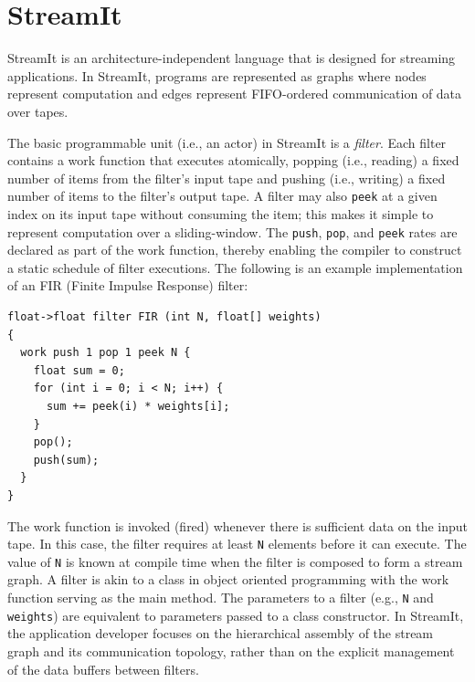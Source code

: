\section{StreamIt}
\label{sec:streamit}

StreamIt  is   an  architecture-independent  language that is
designed for  streaming applications. In StreamIt, programs are
represented as graphs where  nodes represent  computation and edges
represent FIFO-ordered communication of data over tapes.

The  basic programmable  unit (i.e., an actor) in  StreamIt is a {\it
filter}.   Each filter contains  a work  function that executes
atomically,  popping (i.e., reading)  a fixed number  of items  from
the  filter's input  tape and pushing (i.e., writing) a fixed number
of items to the filter's output tape.  A filter  may also {\tt peek} at
a given index  on its input tape without  consuming  the  item;  this
makes  it  simple  to  represent computation over a
sliding-window.   The {\tt push}, {\tt pop}, and {\tt peek} rates are
declared as part  of  the work  function,  thereby enabling  the
compiler    to construct a static schedule of filter executions. The
following is an example implementation of an FIR   (Finite Impulse
Response)  filter: 
{\small
\begin{verbatim}
float->float filter FIR (int N, float[] weights) 
{
  work push 1 pop 1 peek N {
    float sum = 0;
    for (int i = 0; i < N; i++) {
      sum += peek(i) * weights[i];
    }
    pop();
    push(sum);
  }
}
\end{verbatim}}

The work function is invoked (fired) whenever there is sufficient data
on the input tape. In this case, the filter requires at least
\texttt{N} elements before it can execute. The value of \texttt{N} is
known at compile time when the filter is composed to form a stream
graph. A filter is akin to a class in object oriented programming
with the work function serving as the main method. The parameters
to a filter (e.g., \texttt{N} and \texttt{weights}) are equivalent to
parameters passed to a class constructor. In StreamIt, the
application developer focuses on the hierarchical assembly of the
stream graph and its communication topology, rather than on the 
explicit management of the data buffers between filters.

